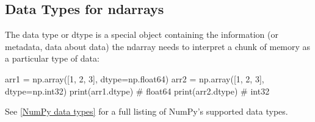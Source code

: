 \subsection{Data Types for ndarrays\label{Data Types for ndarrays}}
The data type or dtype is a special object containing the information (or metadata, data about data) the ndarray needs to interpret a chunk of memory as a particular type of data:
\begin{pyc}
arr1 = np.array([1, 2, 3], dtype=np.float64)
arr2 = np.array([1, 2, 3], dtype=np.int32)
print(arr1.dtype) # float64
print(arr2.dtype) # int32
\end{pyc}
See \autoref{NumPy data types} for a full listing of NumPy's supported data types.
